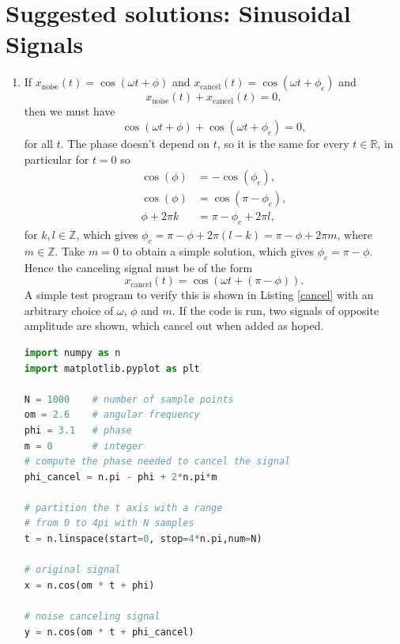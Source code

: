 \newpage
\section{Suggested solutions: Sinusoidal Signals}
\begin{enumerate}
\item If $x_{\text{noise}}(t)=\cos(\omega t+\phi)$ and $x_{\text{cancel}}(t)=\cos(\omega t+\phi_{c})$ and
$$x_{\text{noise}}(t)+x_{\text{cancel}}(t)=0,$$
then we must have
$$\cos(\omega t+\phi)+\cos(\omega t+\phi_{c})=0,$$
for all $t$. The phase doesn't depend on $t$, so it is the same for every $t\in\mathbb{R}$, in particular for $t=0$ so
\begin{align*}
    \cos(\phi)&=-\cos(\phi_{c}), \\
    \cos(\phi)&=\cos(\pi -\phi_{c}), \\
    \phi+2\pi k&=\pi-\phi_{c}+2\pi l,
\end{align*}
for $k,l\in\mathbb{Z}$, which gives $\phi_{c}=\pi-\phi+2\pi(l-k)=\pi-\phi+2\pi m$, where $m\in\mathbb{Z}$. Take $m=0$ to obtain a simple solution, which gives $\phi_{c}=\pi -\phi$.
Hence the canceling signal must be of the form
$$x_{\text{cancel}}(t)=\cos(\omega t+(\pi-\phi)).$$
A simple test program to verify this is shown in Listing \ref{cancel} with an arbitrary choice of $\omega$, $\phi$ and $m$. If the code is run, two signals of opposite amplitude are shown, which cancel out when added as hoped. 

\begin{lstlisting}[language=Python, caption=Noise canceling signal,label=cancel]
import numpy as n
import matplotlib.pyplot as plt

N = 1000    # number of sample points
om = 2.6    # angular frequency
phi = 3.1   # phase
m = 0       # integer
# compute the phase needed to cancel the signal
phi_cancel = n.pi - phi + 2*n.pi*m    

# partition the t axis with a range 
# from 0 to 4pi with N samples
t = n.linspace(start=0, stop=4*n.pi,num=N)

# original signal
x = n.cos(om * t + phi)

# noise canceling signal
y = n.cos(om * t + phi_cancel)


\end{lstlisting}
\end{enumerate}
